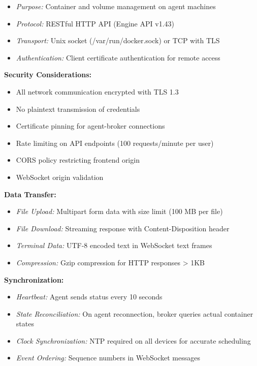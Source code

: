 \documentclass[12pt,a4paper]{article}
\begin{document}
\begin{itemize}
    \item \textit{Purpose:} Container and volume management on agent machines
    \item \textit{Protocol:} RESTful HTTP API (Engine API v1.43)
    \item \textit{Transport:} Unix socket (/var/run/docker.sock) or TCP with TLS
    \item \textit{Authentication:} Client certificate authentication for remote access
\end{itemize}

\textbf{Security Considerations:}

\begin{itemize}
    \item All network communication encrypted with TLS 1.3
    \item No plaintext transmission of credentials
    \item Certificate pinning for agent-broker connections
    \item Rate limiting on API endpoints (100 requests/minute per user)
    \item CORS policy restricting frontend origin
    \item WebSocket origin validation
\end{itemize}

\textbf{Data Transfer:}

\begin{itemize}
    \item \textit{File Upload:} Multipart form data with size limit (100 MB per file)
    \item \textit{File Download:} Streaming response with Content-Disposition header
    \item \textit{Terminal Data:} UTF-8 encoded text in WebSocket text frames
    \item \textit{Compression:} Gzip compression for HTTP responses > 1KB
\end{itemize}

\textbf{Synchronization:}

\begin{itemize}
    \item \textit{Heartbeat:} Agent sends status every 10 seconds
    \item \textit{State Reconciliation:} On agent reconnection, broker queries actual container states
    \item \textit{Clock Synchronization:} NTP required on all devices for accurate scheduling
    \item \textit{Event Ordering:} Sequence numbers in WebSocket messages
\end{itemize}
\end{document}
